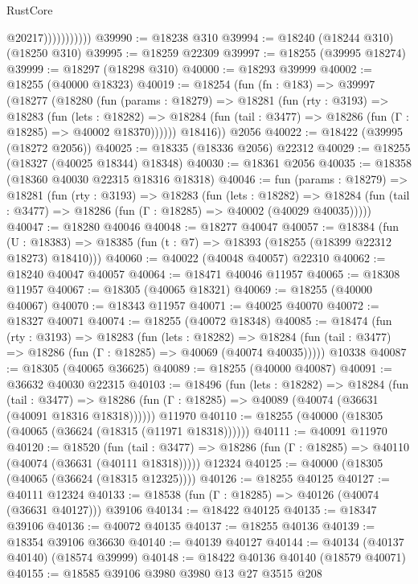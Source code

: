\begin{lexlean}{RustCore}
\begin{coremodule}
                          @20217)))))))))))
@39990 := @18238 @310
@39994 := @18240 (@18244 @310) (@18250 @310)
@39995 := @18259 @22309
@39997 := @18255 (@39995 @18274)
@39999 := @18297 (@18298 @310)
@40000 := @18293 @39999
@40002 := @18255 (@40000 @18323)
@40019 := @18254
    (fun (fn : @183) =>
    @39997
      (@18277
        (@18280
          (fun (params : @18279) =>
          @18281
            (fun (rty : @3193) =>
            @18283
              (fun (lets : @18282) =>
              @18284 (fun (tail : @3477) => @18286 (fun (Γ : @18285) => @40002 @18370))))))
        @18416))
    @2056
@40022 := @18422 (@39995 (@18272 @2056))
@40025 := @18335 (@18336 @2056) @22312
@40029 := @18255 (@18327 (@40025 @18344) @18348)
@40030 := @18361 @2056
@40035 := @18358 (@18360 @40030 @22315 @18316 @18318)
@40046 := fun (params : @18279) =>
  @18281
    (fun (rty : @3193) =>
    @18283
      (fun (lets : @18282) =>
      @18284 (fun (tail : @3477) => @18286 (fun (Γ : @18285) => @40002 (@40029 @40035)))))
@40047 := @18280 @40046
@40048 := @18277 @40047
@40057 := @18384
    (fun (U : @18383) => @18385 (fun (t : @7) => @18393 (@18255 (@18399 @22312 @18273) @18410)))
@40060 := @40022 (@40048 @40057) @22310
@40062 := @18240 @40047 @40057
@40064 := @18471 @40046 @11957
@40065 := @18308 @11957
@40067 := @18305 (@40065 @18321)
@40069 := @18255 (@40000 @40067)
@40070 := @18343 @11957
@40071 := @40025 @40070
@40072 := @18327 @40071
@40074 := @18255 (@40072 @18348)
@40085 := @18474
    (fun (rty : @3193) =>
    @18283
      (fun (lets : @18282) =>
      @18284 (fun (tail : @3477) => @18286 (fun (Γ : @18285) => @40069 (@40074 @40035)))))
    @10338
@40087 := @18305 (@40065 @36625)
@40089 := @18255 (@40000 @40087)
@40091 := @36632 @40030 @22315
@40103 := @18496
    (fun (lets : @18282) =>
    @18284
      (fun (tail : @3477) =>
      @18286 (fun (Γ : @18285) => @40089 (@40074 (@36631 (@40091 @18316 @18318))))))
    @11970
@40110 := @18255 (@40000 (@18305 (@40065 (@36624 (@18315 (@11971 @18318))))))
@40111 := @40091 @11970
@40120 := @18520
    (fun (tail : @3477) => @18286 (fun (Γ : @18285) => @40110 (@40074 (@36631 (@40111 @18318)))))
    @12324
@40125 := @40000 (@18305 (@40065 (@36624 (@18315 @12325))))
@40126 := @18255 @40125
@40127 := @40111 @12324
@40133 := @18538 (fun (Γ : @18285) => @40126 (@40074 (@36631 @40127))) @39106
@40134 := @18422 @40125
@40135 := @18347 @39106
@40136 := @40072 @40135
@40137 := @18255 @40136
@40139 := @18354 @39106 @36630
@40140 := @40139 @40127
@40144 := @40134 (@40137 @40140) (@18574 @39999)
@40148 := @18422 @40136 @40140 (@18579 @40071)
@40155 := @18585 @39106 @3980 @3980 @13 @27 @3515 @208

\end{coremodule}
\end{lexlean}
